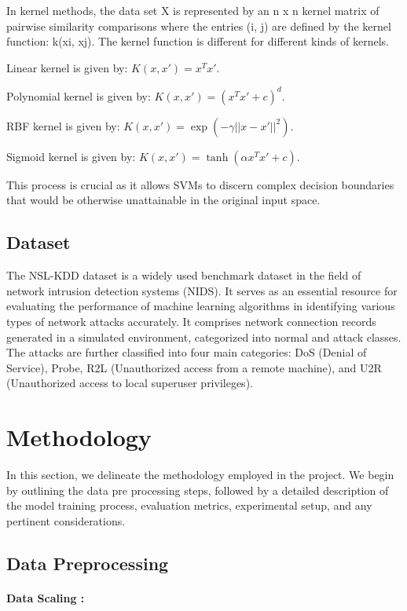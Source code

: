\documentclass{article}
\begin{document}
In kernel methods, the data set X is represented by an n x n kernel matrix of pairwise similarity comparisons where the entries (i, j) are defined by the kernel function: k(xi, xj). The kernel function is different for different kinds of kernels.

Linear kernel is given by: \( K(x, x') = x^T x' \).

Polynomial kernel is given by: \( K(x, x') = (x^T x' + c)^d \).

RBF kernel is given by: \( K(x, x') = \exp(-\gamma ||x - x'||^2) \).

Sigmoid kernel is given by: \( K(x, x') = \tanh(\alpha x^T x' + c) \).


This process is crucial as it allows SVMs to discern complex decision boundaries that would be otherwise unattainable in the original input space. 


\subsection{Dataset}


The NSL-KDD dataset is a widely used benchmark dataset in the field of network intrusion detection systems (NIDS). It serves as an essential resource for evaluating the performance of machine learning algorithms in identifying various types of network attacks accurately. It comprises network connection records generated in a simulated environment, categorized into normal and attack classes. The attacks are further classified into four main categories: DoS (Denial of Service), Probe, R2L (Unauthorized access from a remote machine), and U2R (Unauthorized access to local superuser privileges).
  

\section{Methodology}

In this section, we delineate the methodology employed in the project. We begin by outlining the data pre processing steps, followed by a detailed description of the model training process, evaluation metrics, experimental setup, and any pertinent considerations.

\subsection{Data Preprocessing}

\paragraph{Data Scaling :}
\end{document}
